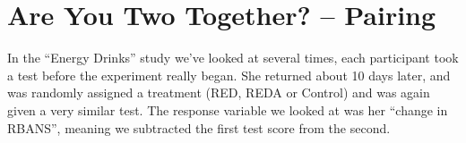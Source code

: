\def\theTopic{Pairing }
\def\dayNum{26 }


\section{ Are You Two Together?  -- Pairing}



   In the ``Energy Drinks'' study we've looked at
  several times, each participant took a test  before the
  experiment really began. She  returned about 10 days later, and was
  randomly assigned a treatment (RED, REDA or Control) and was again
  given a very similar test.  The response variable we looked at
  was her ``change in RBANS'', meaning we subtracted the first test
  score from the second.   
